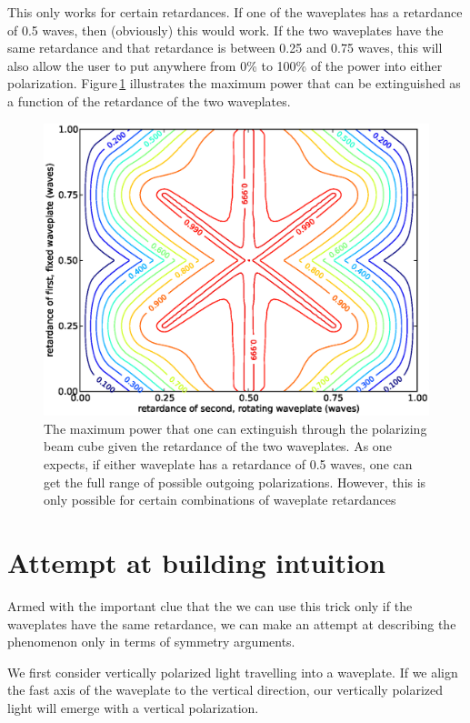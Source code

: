 This only works for certain retardances. If one of the waveplates has a retardance of 0.5 waves, then (obviously) this would work. If the two waveplates have the same retardance and that retardance is between 0.25 and 0.75 waves, this will also allow the user to put anywhere from 0\% to 100\% of the power into either polarization. Figure\,\ref{asymmetric} illustrates the maximum power that can be extinguished as a function of the retardance of the two waveplates.


\begin{figure}
    \centerline{\includegraphics{NewNotesAsymmetricFigure}}
    \caption[Numerical method]{\label{asymmetric}
   The maximum power that one can extinguish through the polarizing beam cube given the retardance of the two waveplates. As one expects, if either waveplate has a retardance of 0.5 waves, one can get the full range of possible outgoing polarizations. However, this is only possible for certain combinations of waveplate retardances}
\end{figure}

\section{Attempt at building intuition}

Armed with the important clue that the we can use this trick only if the waveplates have the same retardance, we can make an attempt at describing the phenomenon only in terms of symmetry arguments.

We first consider vertically polarized light travelling into a waveplate. If we align the fast axis of the waveplate to the vertical direction, our vertically polarized light will emerge with a vertical polarization. 

